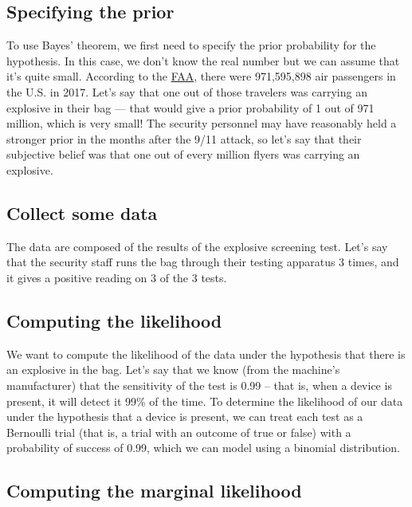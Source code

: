 \documentclass[12pt,]{book}
\theoremstyle{definition}
\theoremstyle{definition}
\theoremstyle{definition}
\theoremstyle{remark}
\begin{document}
\hypertarget{specifying-the-prior}{%
\subsection{Specifying the prior}\label{specifying-the-prior}}

To use Bayes' theorem, we first need to specify the prior probability for the hypothesis. In this case, we don't know the real number but we can assume that it's quite small. According to the \href{https://www.faa.gov/air_traffic/by_the_numbers/media/Air_Traffic_by_the_Numbers_2018.pdf}{FAA}, there were 971,595,898 air passengers in the U.S. in 2017. Let's say that one out of those travelers was carrying an explosive in their bag --- that would give a prior probability of 1 out of 971 million, which is very small! The security personnel may have reasonably held a stronger prior in the months after the 9/11 attack, so let's say that their subjective belief was that one out of every million flyers was carrying an explosive.

\hypertarget{collect-some-data}{%
\subsection{Collect some data}\label{collect-some-data}}

The data are composed of the results of the explosive screening test. Let's say that the security staff runs the bag through their testing apparatus 3 times, and it gives a positive reading on 3 of the 3 tests.

\hypertarget{computing-the-likelihood}{%
\subsection{Computing the likelihood}\label{computing-the-likelihood}}

We want to compute the likelihood of the data under the hypothesis that there is an explosive in the bag. Let's say that we know (from the machine's manufacturer) that the sensitivity of the test is 0.99 -- that is, when a device is present, it will detect it 99\% of the time. To determine the likelihood of our data under the hypothesis that a device is present, we can treat each test as a Bernoulli trial (that is, a trial with an outcome of true or false) with a probability of success of 0.99, which we can model using a binomial distribution.

\hypertarget{computing-the-marginal-likelihood}{%
\subsection{Computing the marginal likelihood}\label{computing-the-marginal-likelihood}}
\end{document}
